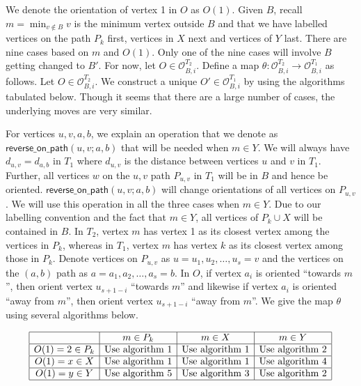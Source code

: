 \documentclass[12pt]{article}
\def\eod{\vrule height 6pt width 5pt depth 0pt}
\newenvironment{proof}{\noindent {\bf Proof:} \hspace{.2em}}
                      {\hspace*{\fill}{\eod}}
\newcommand{\sO}{  \mathcal{ O}}
\newcommand{\revpath}{ \mathsf{reverse\_on\_path}}
\begin{document}
\begin{proof} 
We denote the orientation of vertex 1 in $O$ as $O(1)$.   
Given $B$, recall $m = \min_{v \not\in B} v$ is the minimum vertex outside $B$ and
that we have labelled vertices on the path $P_k$ first, vertices in $X$ next and
vertices of $Y$ last.  
There are nine cases based on $m$ and $O(1)$.  
Only one of the nine cases will involve $B$ getting changed to $B'$.  For 
now, let $O \in \sO_{B,i}^{T_2}$.
Define a map $\theta: \sO_{B,i}^{T_2} \rightarrow \sO_{B,i}^{T_1}$ as follows.
Let $O \in \sO_{B,i}^{T_2}$.  
We construct a unique 
$O' \in \sO_{B,i}^{T_1}$  by using the algorithms tabulated below.  
Though it seems that there are a large number of cases, the underlying
moves are very similar.

For vertices $u,v,a,b$, we explain an operation that we denote as $\revpath(u,v; a,b)$ 
that will be needed when $m \in Y$.  We will always have $d_{u,v} = d_{a,b}$ in 
$T_1$ where $d_{u,v}$ is the distance between vertices $u$ and $v$ in $T_1$.
Further, all vertices $w$ on the $u,v$ path $P_{u,v}$ in $T_1$ will 
be in $B$ and hence be oriented.
$\revpath(u,v;a,b)$ will change orientations of all vertices on $P_{u,v}$.  
We will use this operation in all the three cases  when $m \in Y$.
Due to our labelling convention 
and the fact that  $m \in Y$, all vertices of $P_k \cup X$ will be 
contained in $B$.  In $T_2$, vertex
$m$ has vertex 1 as its closest vertex among the vertices in $P_k$, whereas 
in $T_1$, vertex $m$ has vertex $k$ as its closest vertex among those 
in $P_k$.  Denote vertices on $P_{u,v}$ as $u=u_1,u_2,\ldots,u_s=v$ and
the vertices on the $(a,b)$ path as $a=a_1,a_2,\ldots,a_s=b$.  
In $O$, if vertex $a_i$ is oriented ``towards $m$'', then orient vertex 
$u_{s+1-i}$ ``towards $m$'' and likewise if vertex $a_i$ is oriented 
``away from $m$'', then orient vertex $u_{s+1-i}$ ``away from $m$''.
We give the map $\theta$ using several algorithms below.  


$$ 
\begin{array}{| c | c | c | c |} 
\hline
& m \in P_k & m \in X & m \in Y \\ \hline
O(1)=2 \in P_k & \mbox{Use algorithm 1}  & \mbox{Use algorithm 1} & \mbox{Use algorithm 2} \\ \hline
O(1)=x \in X &  \mbox{Use algorithm 1}  & \mbox{Use algorithm 1} & \mbox{Use algorithm 4} \\ \hline
O(1)=y \in Y &  \mbox{Use algorithm 5}  & \mbox{Use algorithm 3} & \mbox{Use algorithm 2} \\ \hline
\end{array}
$$


\end{proof}
\end{document}
